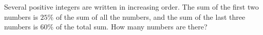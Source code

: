 Several positive integers are written in increasing order. The sum of the first two numbers is $25\%$ of the sum of all the numbers, and the sum of the last three numbers is $60\%$ of the total sum. How many numbers are there?
